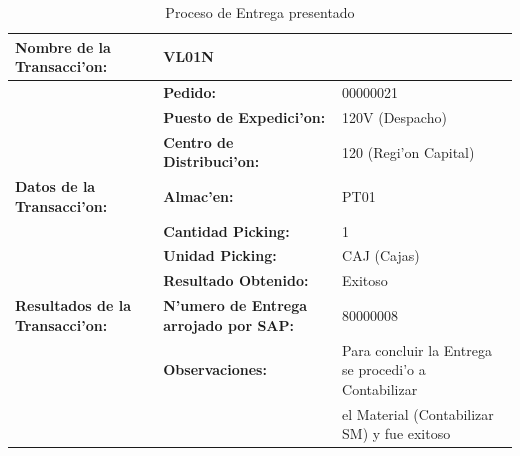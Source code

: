 \begin{table}[h!]
\footnotesize
\scalebox{0.8} {
\begin{tabular}{l l l}
\toprule
\textbf{Nombre de la Transacci'on:} & VL01N &\\
\midrule
                 & \textbf{Pedido:} & 00000021 \\
                 \cmidrule{2-3}
                 & \textbf{Puesto de Expedici'on:} & 120V (Despacho) \\
                 \cmidrule{2-3}
                 & \textbf{Centro de Distribuci'on:} & 120 (Regi'on Capital) \\
                 \cmidrule{2-3}
\textbf{Datos de la Transacci'on:}                  & \textbf{Almac'en:}                   &   PT01 \\
                 \cmidrule{2-3}
                 & \textbf{Cantidad Picking:}            & 1 \\
                 \cmidrule{2-3}
                 & \textbf{Unidad Picking:}              & CAJ (Cajas) \\
                 \midrule
                 & \textbf{Resultado Obtenido:} & Exitoso \\
                 \cmidrule{2-3}
\textbf{Resultados de la Transacci'on:}    & \textbf{N'umero de Entrega arrojado por SAP:} & 80000008 \\
                 \cmidrule{2-3}
                 & \textbf{Observaciones:} &  Para concluir la Entrega se procedi'o a Contabilizar \\
                 &                                      & el Material (Contabilizar SM) y fue exitoso\\
                 \bottomrule
\end{tabular}}
\caption{Proceso de Entrega presentado}
\label{tb:entrega}
\end{table}

